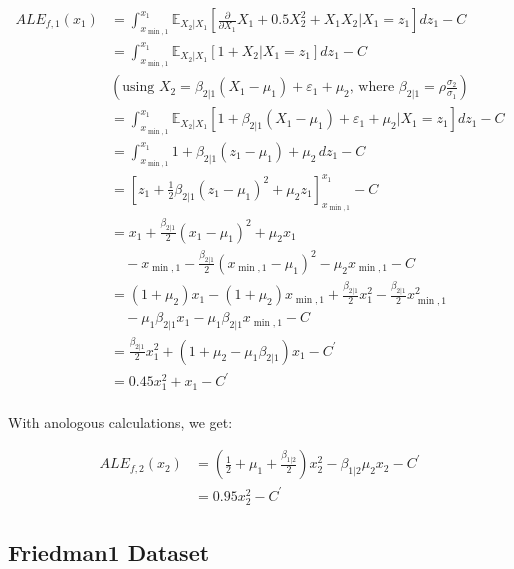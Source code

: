 \documentclass[runningheads]{llncs}
\begin{document}
\begin{align*}
    ALE_{f,1}(x_1) &= \int_{x_{\min,1}}^{x_1} \mathbb{E}_{X_2|X_1}\left[\frac{\partial}{\partial X_1} X_1 + 0.5 X_2^2 + X_1X_2 \Big| X_1=z_1\right] dz_1 - C \\
    &= \int_{x_{\min,1}}^{x_1} \mathbb{E}_{X_2|X_1}\left[1 + X_2 \Big| X_1=z_1\right] dz_1 - C \\
    &(\text{using } X_2 = \beta_{2|1}(X_1-\mu_1) + \varepsilon_1 + \mu_2\text{, where } \beta_{2|1}=\rho \frac{\sigma_2}{\sigma_1}) \\
    &= \int_{x_{\min,1}}^{x_1} \mathbb{E}_{X_2|X_1}\left[1 + \beta_{2|1}(X_1-\mu_1) + \varepsilon_1 + \mu_2 \Big| X_1=z_1\right] dz_1 - C \\
    &= \int_{x_{\min,1}}^{x_1} 1 + \beta_{2|1}(z_1-\mu_1) + \mu_2 \,dz_1 - C \\
    &= [z_1 + \frac{1}{2}\beta_{2|1}(z_1-\mu_1)^2 + \mu_2 z_1]_{x_{\min,1}}^{x_1} - C \\
    &= x_1 + \frac{\beta_{2|1}}{2}(x_1-\mu_1)^2 + \mu_2 x_1 \\
    & \quad - x_{\min,1} - \frac{\beta_{2|1}}{2}(x_{\min,1}-\mu_1)^2 - \mu_2 x_{\min,1} - C \\
    &= (1 + \mu_2) x_1 - (1 + \mu_2) x_{\min,1} + \frac{\beta_{2|1}}{2} x_1^2 - \frac{\beta_{2|1}}{2} x_{\min,1}^2 \\
    & \quad - \mu_1 \beta_{2|1} x_1 - \mu_1 \beta_{2|1}  x_{\min,1} - C \\
    &= \frac{\beta_{2|1}}{2} x_1^2 + (1 + \mu_2 - \mu_1 \beta_{2|1}) x_1 - C^\prime \\
    &= 0.45 x_1^2 + x_1 - C^\prime
\end{align*}
\\

\noindent With anologous calculations, we get:

\begin{align*}
    ALE_{f,2}(x_2) &= (\frac{1}{2} + \mu_1 + \frac{\beta_{1|2}}{2}) x_2^2 - \beta_{1|2} \mu_2 x_2 - C^\prime \\
    &= 0.95 x_2^2 - C^\prime
\end{align*}


\subsection{Friedman1 Dataset}
\end{document}
